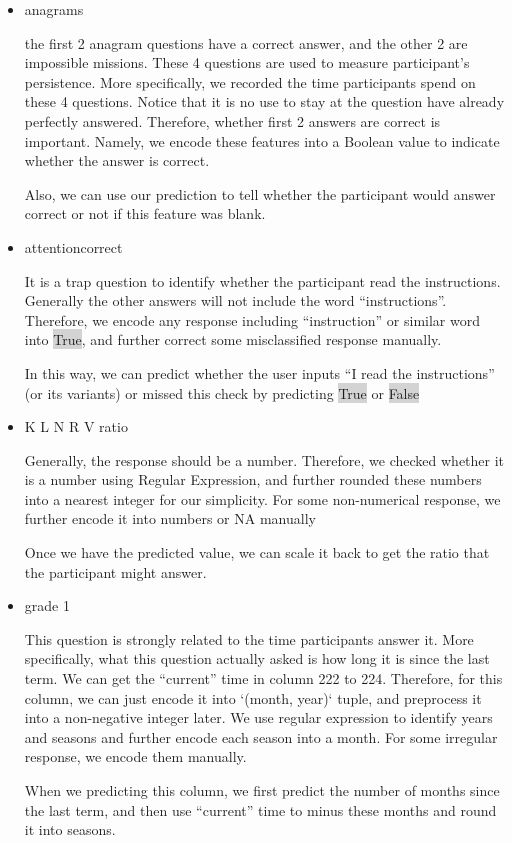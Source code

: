 \documentclass[11pt, a4paper]{article}
\begin{document}
\begin{itemize}
	\item {anagrams}
	\par{the first 2 anagram questions have a correct answer, and the other 2 are impossible missions. These 4 questions are used to measure participant's persistence. More specifically, we recorded the time participants spend on these 4 questions. Notice that it is no use to stay at the question have already perfectly answered. Therefore, whether first 2 answers are correct is important. Namely, we encode these features into a Boolean value to indicate whether the answer is correct.}
	\par{Also, we can use our prediction to tell whether the participant would answer correct or not if this feature was blank.}
	
	\item {attentioncorrect}
	\par{It is a trap question to identify whether the participant read the instructions. Generally the other answers will not include the word ``instructions''. Therefore, we encode any response including ``instruction'' or similar word into \colorbox{lightgray}{True}, and further correct some misclassified response manually.}
	\par{In this way, we can predict whether the user inputs ``I read the instructions'' (or its variants) or missed this check by predicting \colorbox{lightgray}{True} or \colorbox{lightgray}{False}}
	
	\item {K L N R V ratio}
	\par{Generally, the response should be a number. Therefore, we checked whether it is a number using Regular Expression, and further rounded these numbers into a nearest integer for our simplicity. For some non-numerical response, we further encode it into numbers or NA manually}
	\par{Once we have the predicted value, we can scale it back to get the ratio that the participant might answer.}
	
	\item {grade 1}
	\par{This question is strongly related to the time participants answer it. More specifically, what this question actually asked is how long it is since the last term. We can get the ``current'' time in column 222 to 224. Therefore, for this column, we can just encode it into `(month, year)` tuple, and preprocess it into a non-negative integer later. We use regular expression to identify years and seasons and further encode each season into a month. For some irregular response, we encode them manually.}
	\par{When we predicting this column, we first predict the number of months since the last term, and then use ``current'' time to minus these months and round it into seasons.
	}
	

\end{itemize}
\end{document}
